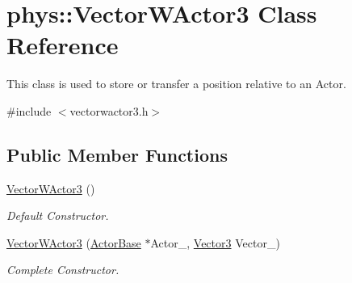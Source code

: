 \hypertarget{classphys_1_1VectorWActor3}{
\section{phys::VectorWActor3 Class Reference}
\label{de/ddc/classphys_1_1VectorWActor3}
}


This class is used to store or transfer a position relative to an Actor.  




{\ttfamily \#include $<$vectorwactor3.h$>$}

\subsection*{Public Member Functions}
\begin{DoxyCompactItemize}
\item 
\hyperlink{classphys_1_1VectorWActor3_acd6cc8c99617e66393aced2f1f36a438}{VectorWActor3} ()
\begin{DoxyCompactList}\small\item\em Default Constructor. \item\end{DoxyCompactList}\item 
\hyperlink{classphys_1_1VectorWActor3_aab8024707cc3747d387d329536bb77f4}{VectorWActor3} (\hyperlink{classphys_1_1ActorBase}{ActorBase} $\ast$Actor\_\-, \hyperlink{classphys_1_1Vector3}{Vector3} Vector\_\-)
\begin{DoxyCompactList}\small\item\em Complete Constructor. \item\end{DoxyCompactList}\end{DoxyCompactItemize}
